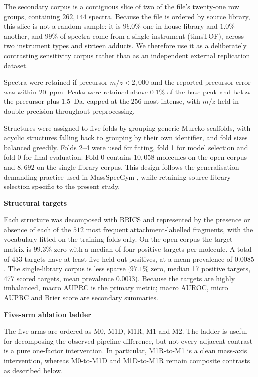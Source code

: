 \documentclass[11pt]{article}
\newcommand{\hd}[1]{\medskip\par\noindent\textbf{#1}\par\nobreak\vspace{2pt}\noindent\ignorespaces}
\newcommand{\mz}{\ensuremath{m/z}}
\begin{document}
The secondary corpus is a contiguous slice of two of the file's twenty-one row groups, containing $262{,}144$ spectra. Because the file is ordered by source library, this slice is not a random sample: it is $99.0\%$ one in-house library and $1.0\%$ another, and $99\%$ of spectra come from a single instrument (timsTOF), across two instrument types and sixteen adducts. We therefore use it as a deliberately contrasting sensitivity corpus rather than as an independent external replication dataset.

Spectra were retained if precursor $\mz<2{,}000$ and the reported precursor error was within $20$~ppm. Peaks were retained above $0.1\%$ of the base peak and below the precursor plus $1.5$~Da, capped at the $256$ most intense, with $\mz$ held in double precision throughout preprocessing.

Structures were assigned to five folds by grouping generic Murcko scaffolds, with acyclic structures falling back to grouping by their own identifier, and fold sizes balanced greedily. Folds 2--4 were used for fitting, fold 1 for model selection and fold 0 for final evaluation. Fold 0 contains $10{,}058$ molecules on the open corpus and $8{,}692$ on the single-library corpus. This design follows the generalisation-demanding practice used in MassSpecGym \cite{bushuiev2024massspecgym}, while retaining source-library selection specific to the present study.

\hd{Structural targets}
Each structure was decomposed with BRICS and represented by the presence or absence of each of the $512$ most frequent attachment-labelled fragments, with the vocabulary fitted on the training folds only. On the open corpus the target matrix is $99.3\%$ zero with a median of four positive targets per molecule. A total of $433$ targets have at least five held-out positives, at a mean prevalence of $0.0085$. The single-library corpus is less sparse ($97.1\%$ zero, median 17 positive targets, 477 scored targets, mean prevalence $0.0093$). Because the targets are highly imbalanced, macro AUPRC is the primary metric; macro AUROC, micro AUPRC and Brier score are secondary summaries.

\hd{Five-arm ablation ladder}
The five arms are ordered as M0, M1D, M1R, M1 and M2. The ladder is useful for decomposing the observed pipeline difference, but not every adjacent contrast is a pure one-factor intervention. In particular, M1R-to-M1 is a clean mass-axis intervention, whereas M0-to-M1D and M1D-to-M1R remain composite contrasts as described below.
\end{document}
